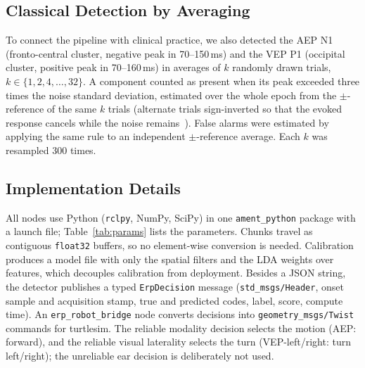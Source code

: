 \documentclass[conference]{IEEEtran}
\begin{document}
\subsection{Classical Detection by Averaging}
To connect the pipeline with clinical practice, we also detected the AEP N1 (fronto-central cluster, negative peak in 70--150\,ms) and the VEP P1 (occipital cluster, positive peak in 70--160\,ms) in averages of $k$ randomly drawn trials, $k\in\{1,2,4,\dots,32\}$. A component counted as present when its peak exceeded three times the noise standard deviation, estimated over the whole epoch from the $\pm$-reference of the same $k$ trials (alternate trials sign-inverted so that the evoked response cancels while the noise remains~\cite{picton2000guidelines}). False alarms were estimated by applying the same rule to an independent $\pm$-reference average. Each $k$ was resampled 300 times.

\subsection{Implementation Details}
All nodes use Python (\texttt{rclpy}, NumPy, SciPy) in one \texttt{ament\_python} package with a launch file; Table~\ref{tab:params} lists the parameters. Chunks travel as contiguous \texttt{float32} buffers, so no element-wise conversion is needed. Calibration produces a model file with only the \Nfilt{} spatial filters and the LDA weights over \Nfeat{} features, which decouples calibration from deployment. Besides a JSON string, the detector publishes a typed \texttt{ErpDecision} message (\texttt{std\_msgs/Header}, onset sample and acquisition stamp, true and predicted codes, label, score, compute time). An \texttt{erp\_robot\_bridge} node converts decisions into \texttt{geometry\_msgs/Twist} commands for turtlesim. The reliable modality decision selects the motion (AEP: forward), and the reliable visual laterality selects the turn (VEP-left/right: turn left/right); the unreliable ear decision is deliberately not used.


\end{document}

